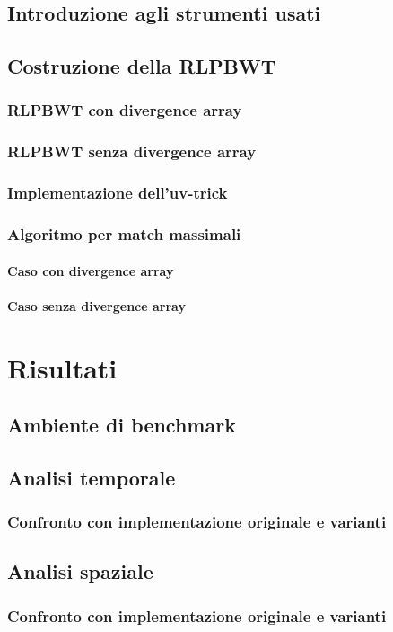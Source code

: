 \documentclass[a4paper,12pt, oneside]{book}
\begin{document}
\section{Introduzione agli strumenti usati}
\section{Costruzione della RLPBWT}
\subsection{RLPBWT con divergence array}
\subsection{RLPBWT senza divergence array}
\subsection{Implementazione dell'uv-trick}
\subsection{Algoritmo per match massimali}
\subsubsection{Caso con divergence array}
\subsubsection{Caso senza divergence array}
\chapter{Risultati}
\section{Ambiente di benchmark}
\section{Analisi temporale}
\subsection{Confronto con implementazione originale e varianti}
\section{Analisi spaziale}
\subsection{Confronto con implementazione originale e varianti}
\end{document}
